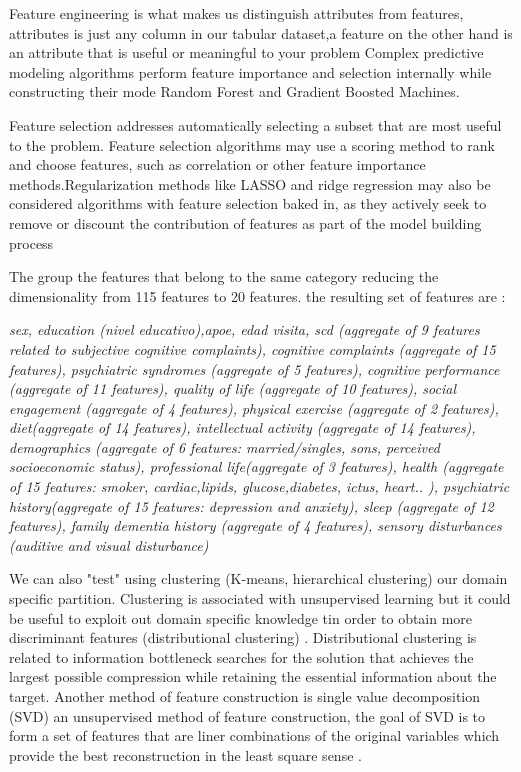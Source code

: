 \documentclass[11pt]{article}
\begin{document}
Feature engineering is what makes us distinguish attributes from features, attributes is just any column in our tabular dataset,a feature on the other hand is an attribute that is useful or meaningful to your problem
Complex predictive modeling algorithms perform feature importance and selection internally while constructing their mode Random Forest and Gradient Boosted Machines.

Feature selection addresses automatically selecting a subset that are most useful to the problem. Feature selection algorithms may use a scoring method to rank and choose features, such as correlation or other feature importance methods.Regularization methods like LASSO and ridge regression may also be considered algorithms with feature selection baked in, as they actively seek to remove or discount the contribution of features as part of the model building process

The group the features that belong to the same category reducing the dimensionality from 115 features to 20 features.
the resulting set of features are : 
\begin{center}
\textit{sex, education (nivel educativo),apoe, edad visita, scd (aggregate of 9 features related to subjective cognitive complaints), cognitive complaints (aggregate of 15 features), psychiatric syndromes (aggregate of 5 features), cognitive performance (aggregate of 11 features), quality of life (aggregate of 10 features), social engagement (aggregate of 4 features), physical exercise (aggregate of 2 features), diet(aggregate of 14 features), intellectual activity (aggregate of 14 features), demographics (aggregate of 6 features: married/singles, sons, perceived socioeconomic status), professional life(aggregate of 3 features), health (aggregate of 15 features: smoker, cardiac,lipids, glucose,diabetes, ictus, heart.. ), psychiatric history(aggregate of 15 features: depression and anxiety), sleep (aggregate of 12 features), family dementia history (aggregate of 4 features), sensory disturbances (auditive and visual disturbance) } 

\end{center}

We can also "test" using clustering (K-means, hierarchical clustering) our domain specific partition. Clustering is associated with unsupervised learning but it could be useful to exploit out domain specific knowledge tin order to obtain more discriminant features (distributional clustering) \cite{guyon2003introduction}. Distributional clustering is related to information bottleneck \cite{tishby2015deep} searches for the solution that achieves the largest possible compression while retaining the essential information about the target.
Another method of feature construction is single value decomposition (SVD) an unsupervised method of feature construction, the goal of SVD is to form a set of features that are liner combinations of the original variables which provide the best reconstruction in the least square sense \cite{duda2012pattern}.  
\end{document}
